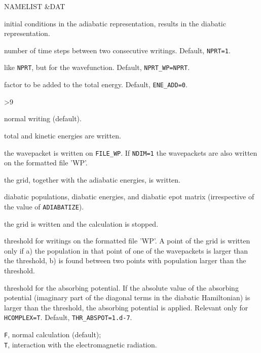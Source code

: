 \documentclass[12pt,fleqn]{article}
\begin{document}
\begin{labeling}{NAMELIST \&DAT}
\begin{labeling}{3}
                       \item[3] initial conditions in the adiabatic representation, results in the diabatic
                      representation.
                    \end{labeling}
  \item[NPRT] number of time steps between two consecutive writings. Default, \texttt{NPRT=1}.
  \item[NPRT\_WP] like \texttt{NPRT}, but for the wavefunction. Default, \texttt{NPRT\_WP=NPRT}.
  \item[ENE\_ADD] factor to be added to the total energy. Default, \texttt{ENE\_ADD=0}.
  \item[IWRT] \begin{labeling}{>9}
                       \setlength{\itemsep}{-0.5ex}
                       \item[0] normal writing (default).
                       \item[>0] total and kinetic energies are written.
                       \item[>1] the wavepacket is written on \texttt{FILE\_WP}. If \texttt{NDIM=1} the
                         wavepackets are also written on the formatted file 'WP'.
                       \item[>2] the grid, together with the adiabatic energies, is written.
                       \item[>3] diabatic populations, diabatic energies, and diabatic epot matrix 
                         (irrespective of the value of \texttt{ADIABATIZE}). 
                       \item[>9] the grid is written and the calculation is stopped.
                    \end{labeling}
  \item[THRWP] threshold for writings on the formatted file 'WP'. A point of the grid is
    written only if a) the population in that point of one of the wavepackets is larger than 
    the threshold, b) is found between two points with population larger than the threshold.
  \item[THR\_ABSPOT] threshold for the absorbing potential. If the absolute value of the absorbing potential
    (imaginary part of the diagonal terms in the diabatic Hamiltonian) is larger than the threshold, the
    absorbing potential is applied. Relevant only for \texttt{HCOMPLEX=T}. Default,
    \texttt{THR\_ABSPOT=1.d-7}.
  \item[RADIATION] \texttt{F}, normal calculation (default); \\ 
    \texttt{T}, interaction with the electromagnetic radiation.
\end{labeling}
\end{document}
